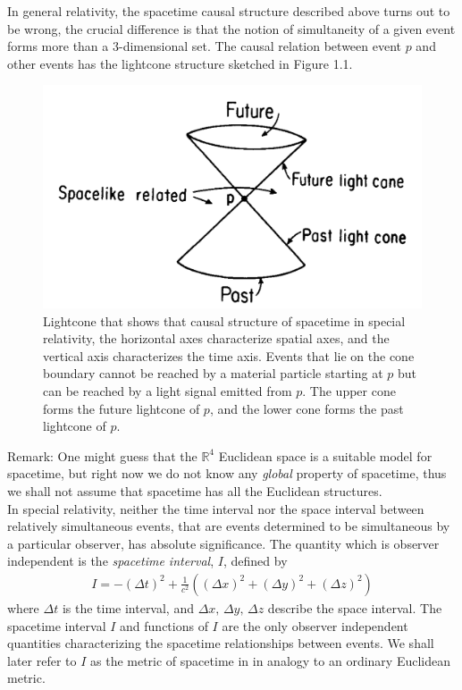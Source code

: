 \documentclass[11pt, onesided]{book}
\theoremstyle{break}
\theoremstyle{break}
\newcommand{\R}{\mathbb{R}}
\newcommand{\remark}{\color{blue}Remark: \color{black}}
\begin{document}
In general relativity, the spacetime causal structure described above turns out to be wrong, the crucial difference is that the notion of simultaneity of a given event forms more than a $3$-dimensional set. The causal relation between event $p$ and other events has the lightcone structure sketched in Figure 1.1.\\
\begin{figure}
\begin{center}
\includegraphics[scale=0.15]{lightcone.png}
\end{center}
\caption{Lightcone that shows that causal structure of spacetime in special relativity, the horizontal axes characterize spatial axes, and the vertical axis characterizes the time axis. Events that lie on the cone boundary cannot be reached by a material particle starting at $p$ but can be reached by a light signal emitted from $p$. The upper cone forms the future lightcone of $p$, and the lower cone forms the past lightcone of $p$.}
\end{figure}



\remark One might guess that the $\R^4$ Euclidean space is a suitable model for spacetime, but right now we do not know any \textit{global} property of spacetime, thus we shall not assume that spacetime has all the Euclidean structures.\\ 

In special relativity, neither the time interval nor the space interval between relatively simultaneous events, that are events determined to be simultaneous by a particular observer, has absolute significance. The quantity which is observer independent is the \textit{spacetime interval}, $I$, defined by
\begin{align}
I = -(\Delta t)^2 + \frac{1}{c^2}\left( (\Delta x)^2 +(\Delta y)^2 +(\Delta z)^2 \right)
\end{align}
where $\Delta t$ is the time interval, and $\Delta x,\, \Delta y,\, \Delta z$ describe the space interval. The spacetime interval $I$ and functions of $I$ are the only observer independent quantities characterizing the spacetime relationships between events. We shall later refer to $I$ as the metric of spacetime in in analogy to an ordinary Euclidean metric. \\
\end{document}
